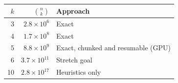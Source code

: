 \begin{tabular}{rrl}
\toprule
$k$ & $\binom{n}{k}$ & Approach \\
\midrule
3 & $2.8\times10^{6}$ & Exact \\
4 & $1.7\times10^{8}$ & Exact \\
5 & $8.8\times10^{9}$ & Exact, chunked and resumable (GPU) \\
6 & $3.7\times10^{11}$ & Stretch goal \\
10 & $2.8\times10^{17}$ & Heuristics only \\
\bottomrule
\end{tabular}
